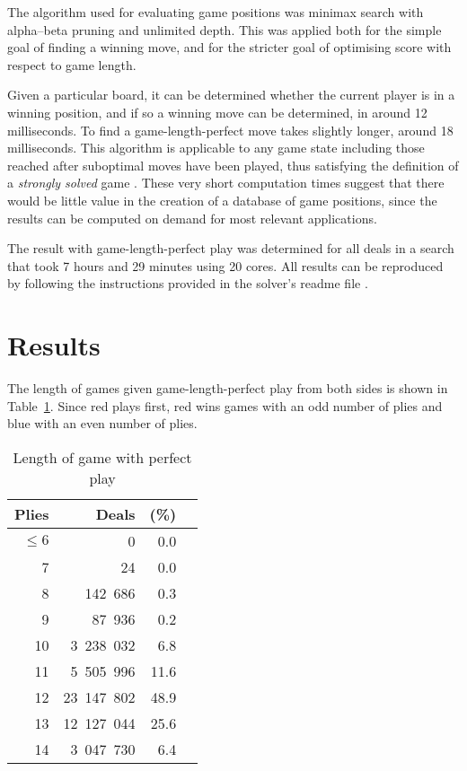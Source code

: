 \documentclass[a4paper, twocolumn]{article}
\begin{document}
The algorithm used for evaluating game positions was minimax search with
alpha--beta pruning and unlimited depth. This was applied both for the simple
goal of finding a winning move, and for the stricter goal of optimising score
with respect to game length.

Given a particular board, it can be determined whether the current player is in
a winning position, and if so a winning move can be determined, in around 12
milliseconds. To find a game-length-perfect move takes slightly longer, around
18 milliseconds. This algorithm is applicable to any game state including those
reached after suboptimal moves have been played, thus satisfying the definition
of a \textit{strongly solved} game \cite{games-solved}. These very short
computation times suggest that there would be little value in the creation of a
database of game positions, since the results can be computed on demand for most
relevant applications.

The result with game-length-perfect play was determined for all deals in a
search that took 7 hours and 29 minutes using 20 cores. All results can be
reproduced by following the instructions provided in the solver's readme file
\cite{github}.


\section{Results}

The length of games given game-length-perfect play from both sides is shown in
Table~\ref{tab:game-length}. Since red plays first, red wins games with an odd
number of plies and blue with an even number of plies.

\begin{table}[ht]
  \centering
  \begin{tabular}{r r r c}
    \hline
    \textbf{Plies} & \textbf{Deals} & \textbf{(\%)} \\
    \hline
    $\leq 6$ & 0 & 0.0 \\
    7 & 24 & 0.0 \\
    8 & 142~686 & 0.3 \\
    9 & 87~936 & 0.2 \\
    10 & 3~238~032 & 6.8 \\
    11 & 5~505~996 & 11.6 \\
    12 & 23~147~802 & 48.9 \\
    13 & 12~127~044 & 25.6 \\
    14 & 3~047~730 & 6.4 \\
    \hline
  \end{tabular}
  \caption{Length of game with perfect play}
  \label{tab:game-length}
\end{table}
\end{document}
